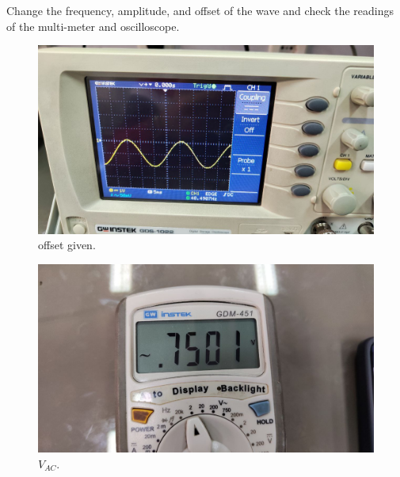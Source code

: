 \documentclass[11pt]{article}
\newcommand{\PicScale}{0.2}
\begin{document}
\begin{question}
\begin{subquestion}{Change the frequency, amplitude, and offset of the wave and check the readings of the multi-meter and oscilloscope.}
{            \begin{figure}[H]
                \begin{center}
                    \includegraphics[scale=\PicScale]{Fig/27.jpeg}
                    \caption{offset given.}
                \end{center}
            \end{figure}
            \begin{figure}[H]
                \begin{center}
                    \includegraphics[scale=\PicScale]{Fig/28.jpeg}
                    \caption{$V_{AC}$.}
                \end{center}
            \end{figure}

}
\end{subquestion}
\end{question}
\end{document}
